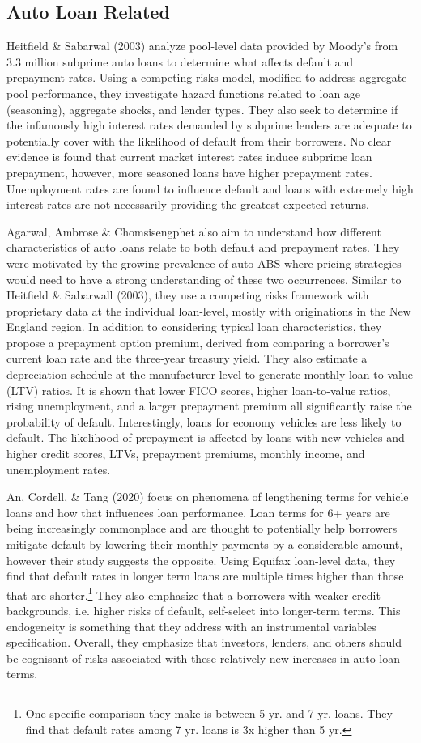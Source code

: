 \documentclass[10.5pt]{article}
\begin{document}
\subsection{Auto Loan Related}
Heitfield \& Sabarwal (2003) analyze pool-level data provided by Moody's from 3.3 million subprime auto loans  to determine what affects default and prepayment rates. Using a competing risks model, modified to address aggregate pool performance, they investigate hazard functions related to loan age (seasoning), aggregate shocks, and lender types. They also seek to determine if the infamously high interest rates demanded by subprime lenders are adequate to potentially cover with the likelihood of default from their borrowers. No clear evidence is found that current market interest rates induce subprime loan prepayment, however, more seasoned loans have higher prepayment rates. Unemployment rates are found to influence default and loans with extremely high interest rates are not necessarily providing the greatest expected returns.

Agarwal, Ambrose \& Chomsisengphet also aim to understand how different characteristics of auto loans relate to both default and prepayment rates. They were motivated by the growing prevalence of auto ABS where pricing strategies would need to have a strong understanding of these two occurrences. Similar to Heitfield \& Sabarwall (2003), they use a competing risks framework with proprietary data at the individual loan-level, mostly with originations in the New England region. In addition to considering typical loan characteristics, they propose a prepayment option premium, derived from comparing a borrower's current loan rate and the three-year treasury yield. They also estimate a depreciation schedule at the manufacturer-level to generate monthly loan-to-value (LTV) ratios. It is shown that lower FICO scores, higher loan-to-value ratios, rising unemployment, and a larger prepayment premium all significantly raise the probability of default. Interestingly, loans for economy vehicles are less likely to default. The likelihood of prepayment is affected by loans with new vehicles and higher credit scores, LTVs, prepayment premiums, monthly income, and unemployment rates.   

An, Cordell, \& Tang (2020) focus on phenomena of lengthening terms for vehicle loans and how that influences loan performance. Loan terms for 6+ years are being increasingly commonplace and are thought to potentially help borrowers mitigate default by lowering their monthly payments by a considerable amount, however their study suggests the opposite. Using Equifax loan-level data, they find that default rates in longer term loans are multiple times higher than those that are shorter.\footnote{One specific comparison they make is between 5 yr. and 7 yr. loans. They find that default rates among 7 yr. loans is 3x higher than 5 yr.} They also emphasize that a borrowers with weaker credit backgrounds, i.e. higher risks of default, self-select into longer-term terms. This endogeneity is something that they address with an instrumental variables specification. Overall, they emphasize that investors, lenders, and others should be cognisant of risks associated with these relatively new increases in auto loan terms. 
\end{document}
